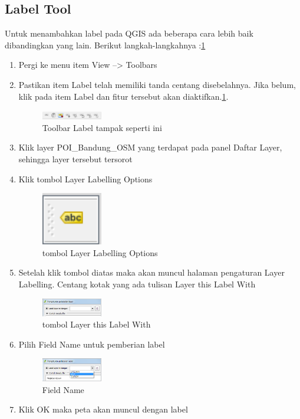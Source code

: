 \subsection{Label Tool}
Untuk menambahkan label pada QGIS ada beberapa cara lebih baik dibandingkan yang lain. Berikut langkah-langkahnya :\ref{label}
\begin{enumerate}
\item
Pergi ke menu item View --> Toolbars
\item
Pastikan item Label telah memiliki tanda centang disebelahnya. Jika belum, klik pada item Label dan fitur tersebut akan diaktifkan.\ref{label}.
\begin{figure}[ht]
    \centerline{\includegraphics[width=0.25\textwidth]{figures/label}}
    \caption{Toolbar Label tampak seperti ini}
    \label{label}
    \end{figure}
\item
Klik layer POI\_Bandung\_OSM yang terdapat pada panel Daftar Layer, sehingga layer tersebut tersorot
\item
Klik tombol Layer Labelling Options
\begin{figure}[ht]
    \centerline{\includegraphics[width=0.25\textwidth]{figures/layer}}
    \caption{tombol Layer Labelling Options}
    \label{layer}
    \end{figure}
\item
Setelah klik tombol diatas maka akan muncul halaman pengaturan Layer Labelling. Centang kotak yang ada tulisan Layer this Label With
\begin{figure}[ht]
    \centerline{\includegraphics[width=0.25\textwidth]{figures/laylabel}}
    \caption{tombol Layer this Label With}
    \label{laylabel}
    \end{figure}
\item
Pilih Field Name untuk pemberian label
\begin{figure}[ht]
    \centerline{\includegraphics[width=0.25\textwidth]{figures/name}}
    \caption{Field Name}
    \label{name}
    \end{figure}
\item
Klik OK maka peta akan muncul dengan label
\end{enumerate}


